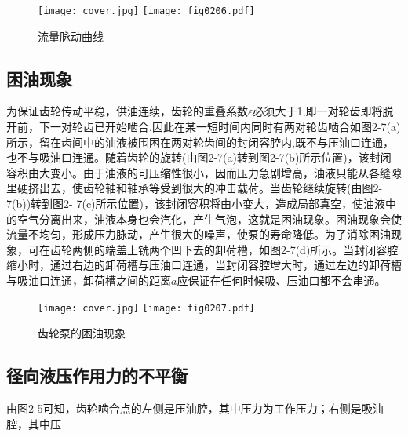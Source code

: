 \begin{figure}
\centering
\ifOpenSource
\texttt{[image: cover.jpg]}
\else
\texttt{[image: fig0206.pdf]}%
\fi
\caption{流量脉动曲线}
\label{fig:fig0206}%
\end{figure}

\subsection{困油现象}



为保证齿轮传动平稳，供油连续，齿轮的重叠系数$\varepsilon$必须大于1,即一对轮齿即将脱开前，下一对轮齿已开始啮合,因此在某一短时间内同时有两对轮齿啮合如图2-7(a)所示，留在齿间中的油液被围困在两对轮齿间的封闭容腔内,既不与压油口连通，也不与吸油口连通。随着齿轮的旋转(由图2-7(a)转到图2-7(b)所示位置)，该封闭容积由大变小。由于油液的可压缩性很小，因而压力急剧增高，油液只能从各缝隙里硬挤出去，使齿轮轴和轴承等受到很大的冲击载荷。当齿轮继续旋转(由图2-7(b))转到图2- 7(c)所示位置)，该封闭容积将由小变大，造成局部真空，使油液中的空气分离出来，油液本身也会汽化，产生气泡，这就是困油现象。困油现象会使流量不均匀，形成压力脉动，产生很大的噪声，使泵的寿命降低。为了消除困油现象，可在齿轮两侧的端盖上铣两个凹下去的卸荷槽，如图2-7(d)所示。当封闭容腔缩小时，通过右边的卸荷槽与压油口连通，当封闭容腔增大时，通过左边的卸荷槽与吸油口连通，卸荷槽之间的距离$a$应保证在任何时候吸、压油口都不会串通。

\begin{figure}
\centering
\ifOpenSource
\texttt{[image: cover.jpg]}
\else
\texttt{[image: fig0207.pdf]}%
\fi
\caption{齿轮泵的困油现象}
\label{fig:fig0207}%
\end{figure}


\subsection{径向液压作用力的不平衡}
由图2-5可知，齿轮啮合点的左侧是压油腔，其中压力为工作压力；右侧是吸油腔，其中压